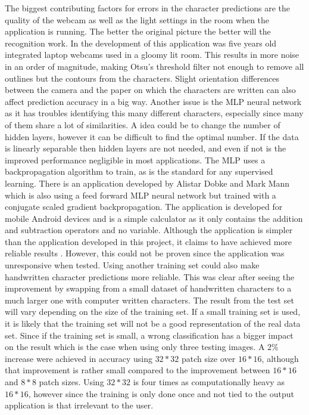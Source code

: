 \documentclass[12pt]{report}
\begin{document}
The biggest contributing factors for errors in the character predictions are the quality of the webcam as well as the light settings in the room when the application is running. The better the original picture the better will the recognition work. In the development of this application was five years old integrated laptop webcams used in a gloomy lit room. This results in more noise in an order of magnitude, making Otsu's threshold filter not enough to remove all outlines but the contours from the characters. Slight orientation differences between the camera and the paper on which the characters are written can also affect prediction accuracy in a big way. Another issue is the MLP neural network as it has troubles identifying this many different characters, especially since many of them share a lot of similarities. A idea could be to change the number of hidden layers, however it can be difficult to find the optimal number. If the data is linearly separable then hidden layers are not needed, and even if not is the improved performance negligible in most applications. 
\newline
\newline
The MLP uses a backpropagation algorithm to train, as is the standard for any supervised learning. There is an application developed by Alistar Dobke and Mark Mann which is also using a feed forward MLP neural network but trained with a conjugate scaled gradient backpropagation. The application is developed for mobile Android devices and is a simple calculator as it only contains the addition and subtraction operators and no variable. Although the application is simpler than the application developed in this project, it claims to have achieved more reliable results \cite{app}. However, this could not be proven since the application was unresponsive when tested. Using another training set could also make handwritten character predictions more reliable. This was clear after seeing the improvement by swapping from a small dataset of handwritten characters to a much larger one with computer written characters. The result from the test set will vary depending on the size of the training set. If a small training set is used, it is likely that the training set will not be a good representation of the real data set. Since if the training set is small, a wrong classification has a bigger impact on the result which is the case when using only three testing images. A $2\%$ increase were achieved in accuracy using $32*32$ patch size over $16*16$, although that improvement is rather small compared to the improvement between $16*16$ and $8*8$ patch sizes. Using $32*32$ is four times as computationally heavy as $16*16$, however since the training is only done once and not tied to the output application is that irrelevant to the user. 
\end{document}
